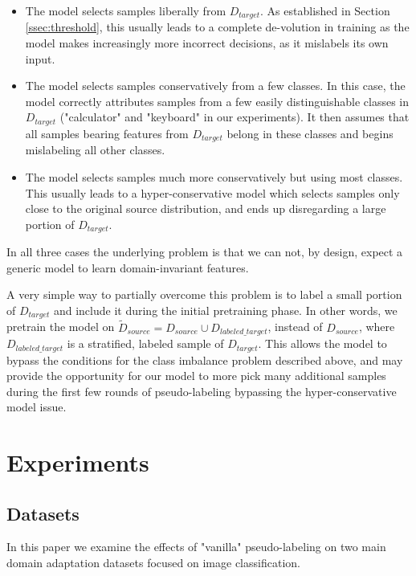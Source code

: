 \documentclass{article}
\begin{document}
	\begin{itemize}
		\item The model selects samples liberally from $D_{target}$. As established in Section \ref{ssec:threshold}, this usually leads to a complete de-volution in training as the model makes increasingly more incorrect decisions, as it mislabels its own input.
		
		\item The model selects samples conservatively from a few classes. In this case, the model correctly attributes samples from a few easily distinguishable classes in $D_{target}$ ("calculator" and "keyboard" in our experiments). It then assumes that all samples bearing features from $D_{target}$ belong in these classes and begins mislabeling all other classes.
		
		\item The model selects samples much more conservatively but using most classes. This usually leads to a hyper-conservative model which selects samples only close to the original source distribution, and ends up disregarding a large portion of $D_{target}$.
	\end{itemize}

	In all three cases the underlying problem is that we can not, by design, expect a generic model to learn domain-invariant features. 
	
	A very simple way to partially overcome this problem is to label a small portion of $D_{target}$ and include it during the initial pretraining phase. In other words, we pretrain the model on $\tilde{D}_{source} = D_{source} \cup D_{labeled\_target}$, instead of $D_{source}$, where $D_{labeled\_target}$ is a stratified, labeled sample of $D_{target}$. This allows the model to bypass the conditions for the class imbalance problem described above, and may provide the opportunity for our model to more pick many additional samples during the first few rounds of pseudo-labeling bypassing the hyper-conservative model issue.
	
	
	\section{Experiments}
	
	\subsection{Datasets}
	
	In this paper we examine the effects of "vanilla" pseudo-labeling on two main domain adaptation datasets focused on image classification. 
	
\end{document}
